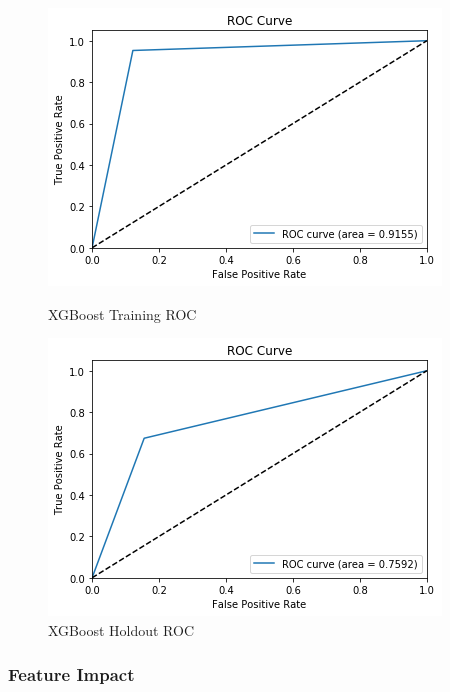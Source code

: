 \begin{figure}[!htb]
\centering
  \begin{minipage}{0.5\textwidth}
    \includegraphics[width=\textwidth]{images/train_auc.png}
    \caption{XGBoost Training ROC}
    \label{fig:xgb_tr}
  \end{minipage}%
  \begin{minipage}{0.5\textwidth}
    \includegraphics[width=\textwidth]{images/test_auc.png}
    \caption{XGBoost Holdout ROC}
    \label{fig:xgb_te}
  \end{minipage}
\end{figure}



\subsubsection{Feature Impact}

